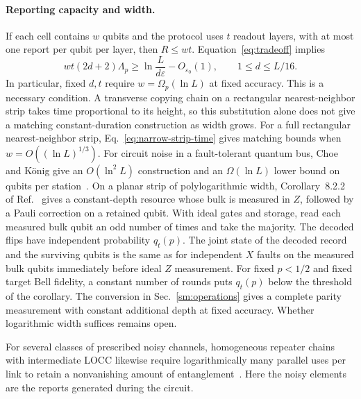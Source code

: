 \documentclass[aps,prl,twocolumn,superscriptaddress,longbibliography,reprint,floatfix]{revtex4-2}
\newcommand{\eps}{\varepsilon}
\begin{document}
\paragraph*{Reporting capacity and width.}
If each cell contains $w$ qubits and the protocol uses $t$ readout layers,
with at most one report per qubit per layer, then $R\le wt$.
Equation~\eqref{eq:tradeoff} implies
\begin{equation}
 wt(2d+2)\Lambda_p
 \ge\ln\frac{L}{d\eps}-O_{\eps_0}(1),
 \qquad 1\le d\le L/16.
 \label{eq:width-budget}
\end{equation}
In particular, fixed $d,t$ require $w=\Omega_p(\ln L)$ at fixed
accuracy. This is a necessary condition. A transverse copying chain
on a rectangular nearest-neighbor strip takes time proportional to its
height, so this substitution alone does not give a matching
constant-duration construction as width grows. For a full rectangular
nearest-neighbor strip, Eq.~\eqref{eq:narrow-strip-time} gives matching
bounds when $w=O((\ln L)^{1/3})$. For circuit noise in a fault-tolerant quantum bus, Choe and
K\"onig give an $O(\ln^2 L)$ construction and an $\Omega(\ln L)$ lower
bound on qubits per station~\cite{Choe2024}. On a planar strip of polylogarithmic width, Corollary~8.2.2 of
Ref.~\cite{Harley2026} gives a constant-depth resource whose bulk is
measured in $Z$, followed by a Pauli correction on a retained qubit.
With ideal gates and storage, read each measured bulk qubit an odd
number of times and take the majority. The decoded flips have
independent probability $q_t(p)$. The joint state of the decoded record and
the surviving qubits is the same as for independent $X$ faults on
the measured bulk qubits immediately before ideal $Z$ measurement.
For fixed $p<1/2$ and fixed target Bell fidelity, a constant number of
rounds puts $q_t(p)$ below the threshold of the corollary. The conversion
in Sec.~\ref{sm:operations} gives a complete parity measurement with
constant additional depth at fixed accuracy. Whether logarithmic width
suffices remains open.

For several classes of prescribed noisy channels, homogeneous repeater chains
with intermediate LOCC likewise require logarithmically many parallel uses per
link to retain a nonvanishing amount of entanglement~\cite{Masajada2026}.
Here the noisy elements are the reports generated during the circuit.
\end{document}
